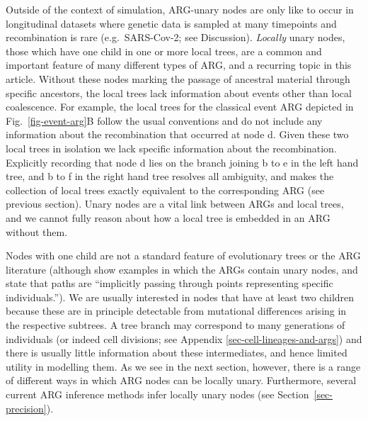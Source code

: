 \documentclass{article}
\newcommand{\noderef}[1]{\textsf{#1}}
\begin{document}
Outside of the context of simulation, ARG-unary nodes are
only like to occur in longitudinal datasets where genetic
data is sampled at many timepoints and recombination
is rare (e.g.~SARS-Cov-2; see Discussion).
\emph{Locally} unary nodes, those which have one child
in one or more local trees, are a common and important feature
of many different types of ARG, and a recurring topic
in this article. Without these nodes marking the passage
of ancestral material through specific ancestors, the local trees
lack information about events other than local coalescence.
For example, the local trees for the classical event ARG
depicted in Fig.~\ref{fig-event-arg}B follow the usual conventions
and do not include any information about the recombination
that occurred at node \noderef{d}. Given these two local trees
in isolation
we lack specific information about the recombination.
Explicitly recording that node \noderef{d} lies on the
branch joining \noderef{b} to \noderef{e} in the left hand
tree, and \noderef{b} to \noderef{f} in the right hand tree
resolves all ambiguity, and makes the collection of local
trees exactly equivalent to the corresponding ARG (see previous section).
Unary nodes are a vital link between ARGs and local trees, and we
cannot fully reason about how a local tree is embedded in an ARG
without them.

Nodes with one child are not a standard feature of evolutionary trees
or the ARG literature
(although \citet{mathieson2020ancestry} show examples in which the ARGs
contain unary nodes, and state that paths are
``implicitly passing through points representing specific individuals.'').
We are usually interested in
nodes that have at least two children because these
are in principle detectable from mutational differences
arising in the respective subtrees.
A tree branch may correspond to many generations
of individuals (or indeed cell divisions; see Appendix \ref{sec-cell-lineages-and-args})
and there is usually
little information about these intermediates, and hence limited utility
in modelling them.
As we see in the next section, however, there is a range of
different ways in which ARG nodes can be locally unary. Furthermore,
several current ARG inference methods infer locally unary nodes
(see Section~\ref{sec-precision}).
\end{document}
